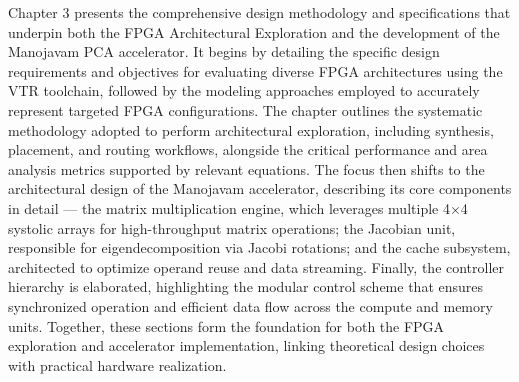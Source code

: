 Chapter 3 presents the comprehensive design methodology and specifications that underpin both the FPGA Architectural Exploration and the development of the Manojavam PCA accelerator. It begins by detailing the specific design requirements and objectives for evaluating diverse FPGA architectures using the VTR toolchain, followed by the modeling approaches employed to accurately represent targeted FPGA configurations. The chapter outlines the systematic methodology adopted to perform architectural exploration, including synthesis, placement, and routing workflows, alongside the critical performance and area analysis metrics supported by relevant equations. The focus then shifts to the architectural design of the Manojavam accelerator, describing its core components in detail — the matrix multiplication engine, which leverages multiple 4×4 systolic arrays for high-throughput matrix operations; the Jacobian unit, responsible for eigendecomposition via Jacobi rotations; and the cache subsystem, architected to optimize operand reuse and data streaming. Finally, the controller hierarchy is elaborated, highlighting the modular control scheme that ensures synchronized operation and efficient data flow across the compute and memory units. Together, these sections form the foundation for both the FPGA exploration and accelerator implementation, linking theoretical design choices with practical hardware realization.

